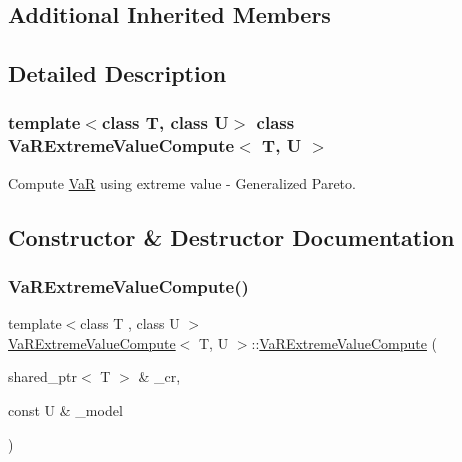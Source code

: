 \subsection*{Additional Inherited Members}


\subsection{Detailed Description}
\subsubsection*{template$<$class T, class U$>$\newline
class Va\+R\+Extreme\+Value\+Compute$<$ T, U $>$}

Compute \hyperlink{classVaR}{VaR} using extreme value -\/ Generalized Pareto. 

\subsection{Constructor \& Destructor Documentation}
\hypertarget{classVaRExtremeValueCompute_ac6a44f45d19035602c3bf885466597bb}{}\label{classVaRExtremeValueCompute_ac6a44f45d19035602c3bf885466597bb} 
\subsubsection{\texorpdfstring{Va\+R\+Extreme\+Value\+Compute()}{VaRExtremeValueCompute()}}
{\footnotesize\ttfamily template$<$class T , class U $>$ \\
\hyperlink{classVaRExtremeValueCompute}{Va\+R\+Extreme\+Value\+Compute}$<$ T, U $>$\+::\hyperlink{classVaRExtremeValueCompute}{Va\+R\+Extreme\+Value\+Compute} (\begin{DoxyParamCaption}\item[{shared\+\_\+ptr$<$ T $>$ \&}]{\+\_\+cr,  }\item[{const U \&}]{\+\_\+model }\end{DoxyParamCaption})\hspace{0.3cm}{\ttfamily [inline]}}

\hypertarget{classVaRExtremeValueCompute_a84bce72bd46b30a48fc6e86bb72201f9}{}\label{classVaRExtremeValueCompute_a84bce72bd46b30a48fc6e86bb72201f9} 
